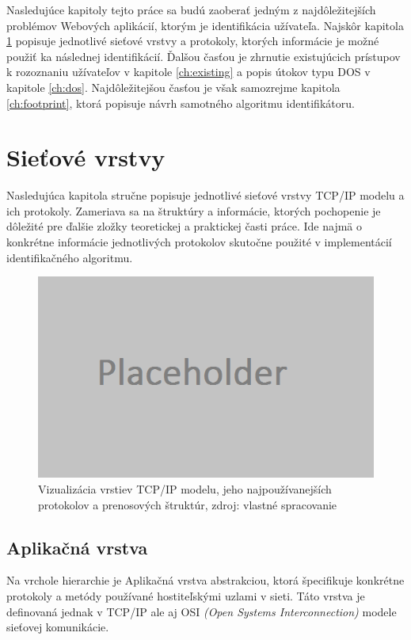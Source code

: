 \documentclass[
  printed, %
  table,   %
  lof,     %
  lot,     %
]{fithesis3}
\begin{document}
Nasledujúce kapitoly tejto práce sa budú zaoberať jedným z najdôležitejších
problémov Webových aplikácií, ktorým je identifikácia užívateľa. Najskôr kapitola
\ref{ch:net-layers} popisuje jednotlivé sieťové vrstvy a protokoly, ktorých
informácie je možné použiť ka následnej identifikácií. Ďalšou časťou je zhrnutie
existujúcich prístupov k rozoznaniu užívateľov v kapitole \ref{ch:existing} a 
popis útokov typu DOS v kapitole \ref{ch:dos}. Najdôležitejšou časťou je však
samozrejme kapitola \ref{ch:footprint}, ktorá popisuje návrh samotného 
algoritmu identifikátoru.

\chapter{Sieťové vrstvy}
\label{ch:net-layers}
Nasledujúca kapitola stručne popisuje jednotlivé sieťové vrstvy TCP/IP modelu a
ich protokoly. Zameriava sa na štruktúry a informácie, ktorých pochopenie je
dôležité pre ďalšie zložky teoretickej a praktickej časti práce. Ide najmä o
konkrétne informácie jednotlivých protokolov skutočne použité v implementácií
identifikačného algoritmu.

\begin{figure}[h]
  \centering
    \includegraphics[width=.80\textwidth]{images/net-layers.png}
  \caption{Vizualizácia vrstiev TCP/IP modelu, jeho najpoužívanejších protokolov
  a prenosových štruktúr, zdroj: vlastné spracovanie}
  \label{fig:net-layers}
\end{figure}

\section{Aplikačná vrstva}
Na vrchole hierarchie je Aplikačná vrstva abstrakciou, ktorá špecifikuje
konkrétne protokoly a metódy používané hostiteľskými uzlami v sieti. Táto
vrstva je definovaná jednak v TCP/IP ale aj OSI
\textit{(Open Systems Interconnection)} modele sieťovej komunikácie.
\end{document}
